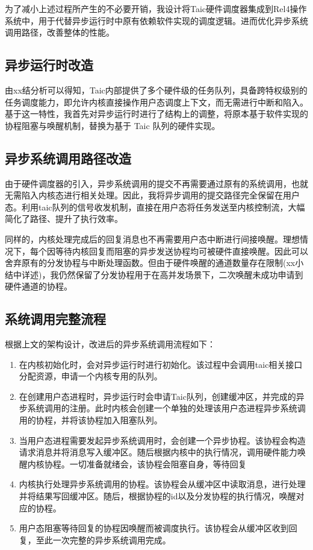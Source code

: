为了减小上述过程所产生的不必要开销，我设计将Taic硬件调度器集成到Rel4操作系统中，用于代替异步运行时中原有依赖软件实现的调度逻辑。进而优化异步系统调用路径，改善整体的性能。

\subsection{异步运行时改造}

由xx结分析可以得知，Taic内部提供了多个硬件级的任务队列，具备跨特权级别的任务调度能力，即允许内核直接操作用户态调度上下文，而无需进行中断和陷入。基于这一特性，我首先对异步运行时进行了结构上的调整，将原本基于软件实现的协程阻塞与唤醒机制，替换为基于 Taic 队列的硬件实现。


\subsection{异步系统调用路径改造}

由于硬件调度器的引入，异步系统调用的提交不再需要通过原有的系统调用，也就无需陷入内核态进行相关处理。因此，我将异步调用的提交路径完全保留在用户态。利用taic队列的信号收发机制，直接在用户态将任务发送至内核控制流，大幅简化了路径、提升了执行效率。

同样的，内核处理完成后的回复消息也不再需要用户态中断进行间接唤醒。理想情况下，每个因等待内核回复而阻塞的异步发送协程均可被硬件直接唤醒。因此可以舍弃原有的分发协程与中断处理函数。但由于硬件唤醒的通道数量存在限制(xx小结中详述)，我仍然保留了分发协程用于在高并发场景下，二次唤醒未成功申请到硬件通道的协程。

\subsection{系统调用完整流程}

根据上文的架构设计，改进后的异步系统调用流程如下：

\begin{enumerate}
  \item 在内核初始化时，会对异步运行时进行初始化。该过程中会调用taic相关接口分配资源，申请一个内核专用的队列。
  \item 在创建用户态进程时，异步运行时会申请Taic队列，创建缓冲区，并完成的异步系统调用的注册。此时内核会创建一个单独的处理该用户态进程异步系统调用的协程，并将该协程加入阻塞队列。
  \item 当用户态进程需要发起异步系统调用时，会创建一个异步协程。该协程会构造请求消息并将消息写入缓冲区。随后根据内核中的执行情况，调用硬件能力唤醒内核协程。一切准备就绪会，该协程会阻塞自身，等待回复
  \item 内核执行处理异步系统调用的协程。该协程会从缓冲区中读取消息，进行处理并将结果写回缓冲区。随后，根据协程的id以及分发协程的执行情况，唤醒对应的协程。
  \item 用户态阻塞等待回复的协程因唤醒而被调度执行。该协程会从缓冲区收到回复，至此一次完整的异步系统调用完成。
\end{enumerate}


